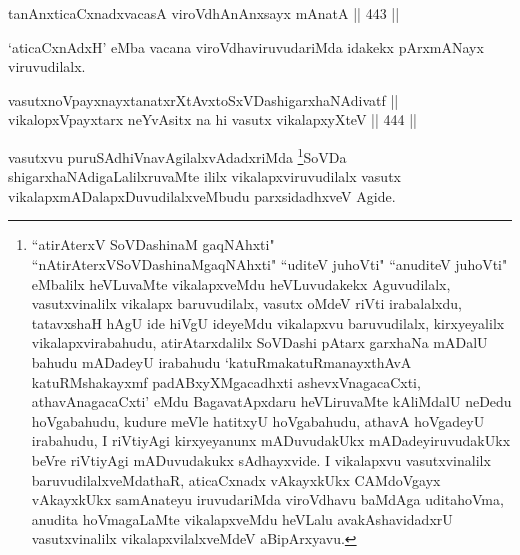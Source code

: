 \begin{shl}
tanAnxticaCxnadxvacasA viroVdhAnAnxsayx mAnatA \hfill || 443 || 
\end{shl}

\begin{artha}
`aticaCxnAdxH' eMba vacana viroVdhaviruvudariMda idakekx pArxmANayx viruvudilalx.
\end{artha}


\begin{shl}
vasutxnoV\s payxnayxtanatxrXtAvxtoSxVDashigarxhaNAdivatf || \\
vikalopxV\s payxtarx neYvAsitx na hi vasutx vikalapxyXteV \hfill || 444 || 
\end{shl}

\begin{artha}
vasutxvu puruSAdhiVnavAgilalxvAdadxriMda \footnote{``atirAterxV SoVDashinaM gaqNAhxti" ``nAtirAterxVSoVDashinaMgaqNAhxti" ``uditeV juhoVti" ``anuditeV juhoVti" eMbalilx heVLuvaMte vikalapxveMdu heVLuvudakekx Aguvudilalx, vasutxvinalilx vikalapx baruvudilalx, vasutx oMdeV riVti irabalalxdu, tatavxshaH hAgU ide hiVgU ideyeMdu vikalapxvu baruvudilalx, kirxyeyalilx vikalapxvirabahudu, atirAtarxdalilx SoVDashi pAtarx garxhaNa mADalU bahudu mADadeyU irabahudu `katuRmakatuRmanayxthAvA katuRMshakayxmf padABxyXMgacadhxti ashevxVnagacaCxti, athavAnagacaCxti' eMdu BagavatApxdaru heVLiruvaMte kAliMdalU neDedu hoVgabahudu, kudure meVle hatitxyU hoVgabahudu, athavA hoVgadeyU irabahudu, I riVtiyAgi kirxyeyanunx mADuvudakUkx mADadeyiruvudakUkx beVre riVtiyAgi mADuvudakukx sAdhayxvide. I vikalapxvu vasutxvinalilx baruvudilalxveMdathaR, aticaCxnadx vAkayxkUkx CAMdoVgayx vAkayxkUkx samAnateyu iruvudariMda viroVdhavu baMdAga uditahoVma, anudita hoVmagaLaMte vikalapxveMdu heVLalu avakAshavidadxrU vasutxvinalilx vikalapxvilalxveMdeV aBipArxyavu.}SoVDa shigarxhaNAdigaLalilxruvaMte ililx vikalapxviruvudilalx vasutx vikalapxmADalapxDuvudilalxveMbudu parxsidadhxveV Agide.
\end{artha}


